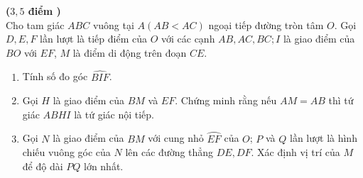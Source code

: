    \begin{ex}%
	\textbf{($3,5$ điểm )}\\
	Cho tam giác $ABC$ vuông tại $A(AB<AC)$ ngoại tiếp đường tròn tâm $O $. Gọi $D,E,F$ lần lượt là tiếp điểm của $O$ với các cạnh $AB, AC, BC;I$ là giao điểm của $BO$ với $EF$, $M$ là điểm di động trên đoạn $CE$.
	\begin{enumerate}[a/]
		\item Tính số đo góc $\widehat{BIF}$.
		\item Gọi $H$ là giao điểm của $BM$ và $EF$. Chứng minh rằng nếu $AM=AB $ thì tứ giác $ABHI$ là tứ giác nội tiếp.
		\item Gọi $N$ là giao điểm của $BM$ với cung nhỏ $\wideparen { EF}$ của $O$; $P$ và $Q$ lần lượt là hình chiếu vuông góc của $N$ lên các đường thẳng $DE,DF$. Xác định vị trí của $M$ để độ dài $PQ$ lớn nhất.              
		

\end{enumerate}
\end{ex}
